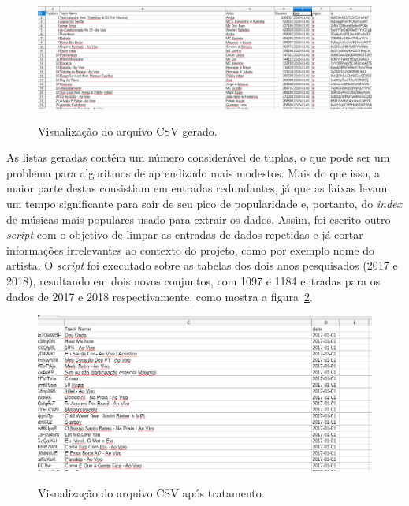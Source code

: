 \begin{figure}[H]
\caption{\small Visualização do arquivo CSV gerado.}
\centering
\includegraphics[width=\textwidth,height=\textheight,keepaspectratio]{../figs/pure_charts_view.PNG}
\label{f.pure_charts_view}
\end{figure}

As listas geradas contém um número considerável de tuplas, o que pode ser um problema para algoritmos de aprendizado mais modestos. Mais do que isso, a maior parte destas consistiam em entradas redundantes, já que as faixas levam um tempo significante para sair de seu pico de popularidade e, portanto, do \textit{index} de músicas mais populares usado para extrair os dados. Assim, foi escrito outro \textit{script} com o objetivo de limpar as entradas de dados repetidas e já cortar informações irrelevantes ao contexto do projeto, como por exemplo nome do artista. O \textit{script} foi executado sobre as tabelas dos dois anos pesquisados (2017 e 2018), resultando em dois novos conjuntos, com 1097 e 1184 entradas para os dados de 2017 e 2018 respectivamente, como mostra a figura~\ref{f.parsed_charts_view}.

\begin{figure}[H]
\caption{\small Visualização do arquivo CSV após tratamento.}
\centering
\includegraphics[width=\textwidth,height=\textheight,keepaspectratio]{../figs/parsed_charts_view.PNG}
\label{f.parsed_charts_view}
\end{figure}


